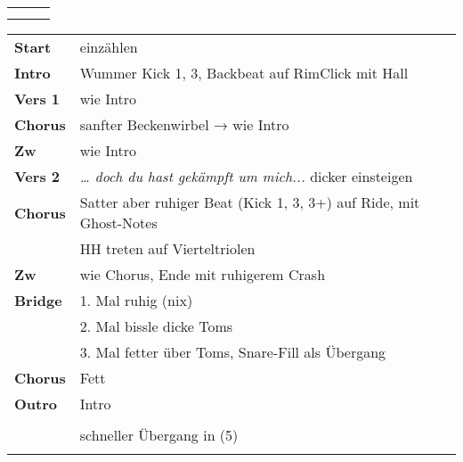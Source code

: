 

\begin{tabular}{p{0.6cm}p{12cm}p{1.4cm}}
	\rowcolor{cyan} \myRow{\thesongnumber} & \myRow{Gewagte Liebe} & \myRow{54t} \\
	                                       &                       &             \\
\end{tabular}

\begin{tabular}{p{1.6cm}l}
	\textbf{Start}  & einzählen                                                          \\
	\textbf{Intro}  & Wummer Kick 1, 3, Backbeat auf RimClick mit Hall                   \\
	\textbf{Vers 1} & wie Intro                                                          \\
	\textbf{Chorus} & sanfter Beckenwirbel → wie Intro                                   \\
	\textbf{Zw}     & wie Intro                                                          \\
	\textbf{Vers 2} & \textit{… doch du hast gekämpft um mich...} dicker einsteigen      \\
	\textbf{Chorus} & Satter aber ruhiger Beat (Kick 1, 3, 3+) auf Ride, mit Ghost-Notes \\
	                & HH treten auf Vierteltriolen                                       \\
	\textbf{Zw}     & wie Chorus, Ende mit ruhigerem Crash                               \\
	\textbf{Bridge} & 1. Mal ruhig (nix)                                                 \\
	                & 2. Mal bissle dicke Toms                                           \\
	                & 3. Mal fetter über Toms, Snare-Fill als Übergang                   \\
	\textbf{Chorus} & Fett                                                               \\
	\textbf{Outro}  & Intro                                                              \\
	                &                                                                    \\
	                & schneller Übergang in (5)                                          \\
	                &                                                                    \\
\end{tabular}